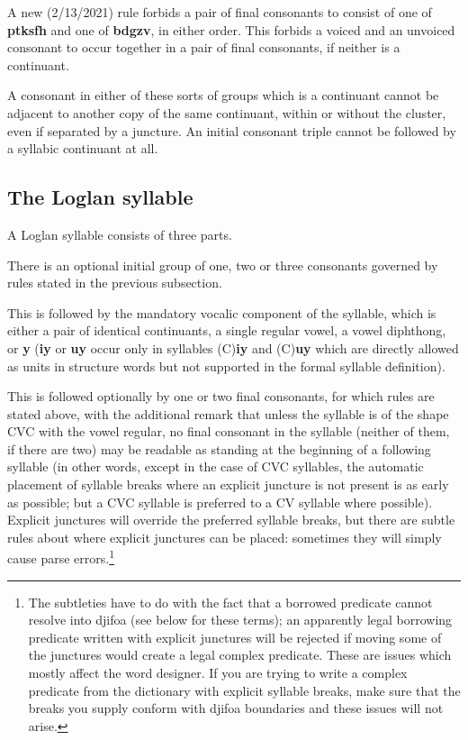 \documentclass[12pt]{book}
\begin{document}
A new (2/13/2021) rule forbids a pair of final consonants to consist of one of {\bf ptksfh} and one of {\bf bdgzv}, in either order.  This forbids a voiced and an unvoiced consonant to occur together in a pair of final consonants, if neither is a continuant.

A consonant in either of these sorts of groups which is a continuant cannot be adjacent to another copy of the same continuant, within or without the cluster, even if separated by a juncture.
An initial consonant triple cannot be followed by a syllabic continuant at all.

\subsection{The Loglan syllable}

A Loglan syllable consists of three parts. 

 There is an optional initial group of one, two or three consonants governed by rules stated in the previous subsection.  

This is followed by the mandatory vocalic component of the syllable, which is either a pair of identical continuants, a single regular vowel, a vowel diphthong, or {\bf y} ({\bf iy}  or {\bf uy} occur only in syllables (C){\bf iy} and (C){\bf uy} which are directly allowed as units in structure words but not supported in the formal syllable definition).

This is followed optionally by one or two final consonants, for which rules are stated above, with the additional remark that unless the syllable is of the shape CVC with the vowel regular,   no final consonant in the syllable (neither of them, if there are two)  may be readable as standing at the beginning of a following syllable (in other words, except in the case of CVC syllables, the automatic placement of syllable breaks where an explicit juncture is not present  is as early as possible;  but a CVC syllable is preferred to a CV syllable where possible).  Explicit junctures will override the preferred syllable breaks, but there are subtle rules about where explicit junctures can be placed:  sometimes they will simply cause parse errors.\footnote{The subtleties have to do with the fact that a borrowed predicate cannot resolve into djifoa (see below for these terms);  an apparently legal borrowing predicate written with explicit junctures will be rejected if moving some of the junctures would create a legal complex predicate.  These are issues which mostly affect the word designer.  If you are trying to write a complex predicate from the dictionary with explicit syllable breaks, make sure that the breaks you supply conform with djifoa boundaries and these issues will not arise.}
\end{document}
